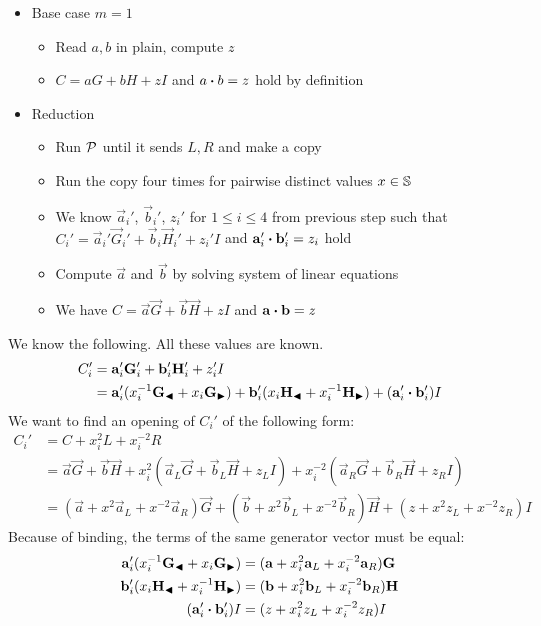 \begin{itemize}
    \item Base case $m = 1$
        \begin{itemize}
            \item Read $a, b$ in plain, compute $z$
            \item $C = aG + bH + zI$ and $a \boldsymbol{\cdot} b = z$ hold by definition
        \end{itemize}
    \item Reduction
        \begin{itemize}
            \item Run $\mathcal{P}$ until it sends $L, R$ and make a copy
            \item Run the copy four times for pairwise distinct values $x \in \mathbb{S}$
            \item We know $\vec{a}_i'$, $\vec{b}_i'$, $z_i'$ for $1 \leq i \leq 4$ from previous step such that $C_i' = \vec{a}_i'\vec{G}_i' + \vec{b}_i\vec{H}_i' + z_i'I$ and $\mathbf{a}_i' \boldsymbol{\cdot} \mathbf{b}_i' = z_i$ hold
            \item Compute $\vec{a}$ and $\vec{b}$ by solving system of linear equations
            \item We have $C = \vec{a}\vec{G} + \vec{b}\vec{H} + zI$ and $\mathbf{a} \boldsymbol{\cdot} \mathbf{b} = z$
        \end{itemize}
\end{itemize}
%
We know the following. All these values are known.
%
\begin{align*}
    C_i'
    &= \mathbf{a}_i'\mathbf{G}_i' + \mathbf{b}_i'\mathbf{H}_i' + z_i'I \\
    &= \mathbf{a}_i'(x_i^{-1}\mathbf{G}_{\blacktriangleleft} + x_i\mathbf{G}_{\blacktriangleright}) + \mathbf{b}_i'(x_i\mathbf{H}_{\blacktriangleleft} + x_i^{-1}\mathbf{H}_{\blacktriangleright}) + (\mathbf{a}_i' \boldsymbol{\cdot} \mathbf{b}_i') I
\end{align*}
%
We want to find an opening of $C_i'$ of the following form:
%
\begin{align*}
    C_i'
    &= C + x_i^2 L + x_i^{-2} R \\
    &= \vec{a}\vec{G} + \vec{b}\vec{H} + x_i^2 (\vec{a}_L\vec{G} + \vec{b}_L\vec{H} + z_L I) + x_i^{-2} (\vec{a}_R\vec{G} + \vec{b}_R\vec{H} + z_R I) \\
    &= (\vec{a} + x^2\vec{a}_L + x^{-2}\vec{a}_R)\vec{G} + (\vec{b} + x^2\vec{b}_L + x^{-2}\vec{b}_R)\vec{H} + (z + x^2z_L + x^{-2}z_R)I
\end{align*}
%
Because of binding, the terms of the same generator vector must be equal:
%
\begin{align*}
    \mathbf{a}_i'(x_i^{-1}\mathbf{G}_{\blacktriangleleft} + x_i\mathbf{G}_{\blacktriangleright}) &= (\mathbf{a} + x_i^2\mathbf{a}_L + x_i^{-2}\mathbf{a}_R)\mathbf{G} \\
    \mathbf{b}_i'(x_i\mathbf{H}_{\blacktriangleleft} + x_i^{-1}\mathbf{H}_{\blacktriangleright}) &= (\mathbf{b} + x_i^2\mathbf{b}_L + x_i^{-2}\mathbf{b}_R)\mathbf{H} \\
    (\mathbf{a}_i' \boldsymbol{\cdot} \mathbf{b}_i') I &= (z + x_i^2z_L + x_i^{-2}z_R)I
\end{align*}
